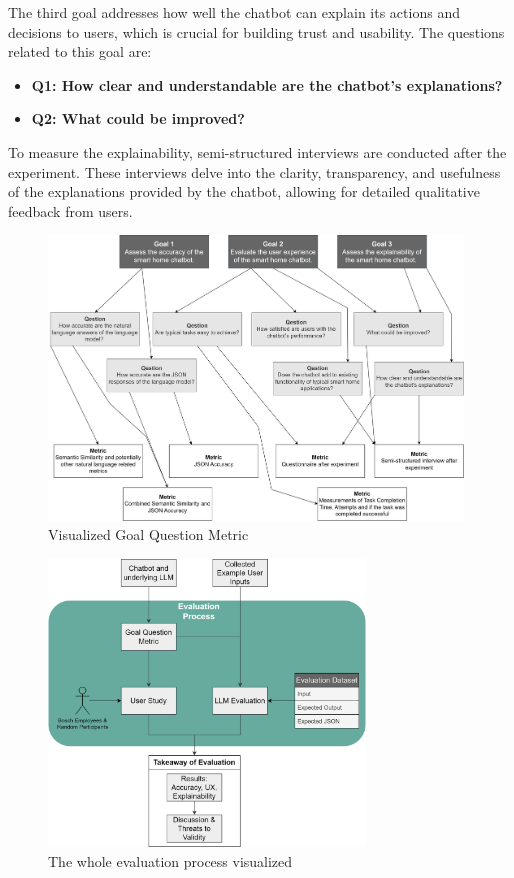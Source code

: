 The third goal addresses how well the chatbot can explain its actions and decisions to users, which is crucial for building trust and usability. The questions related to this goal are:

\begin{itemize}
    \item \textbf{Q1: How clear and understandable are the chatbot's explanations?}
    \item \textbf{Q2: What could be improved?}
\end{itemize}

To measure the explainability, semi-structured interviews are conducted after the experiment. These interviews delve into the clarity, transparency, and usefulness of the explanations provided by the chatbot, allowing for detailed qualitative feedback from users.

\begin{figure}[h]
    \centering
    \captionsetup{justification=centering}
    \includegraphics[width=0.98\textwidth]{graphics/gqm.png}
    \caption{Visualized Goal Question Metric}
    \label{fig:gqm}
\end{figure}
\begin{figure}[h]
    \centering
    \captionsetup{justification=centering}
    \includegraphics[width=0.75\textwidth]{graphics/eval-process.png}
    \caption{The whole evaluation process visualized}
    \label{fig:evalprocess}
\end{figure}

